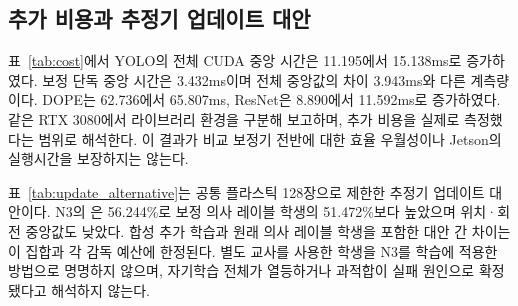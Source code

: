 \subsection{추가 비용과 추정기 업데이트 대안}
표~\ref{tab:cost}에서 YOLO의 전체 CUDA 중앙 시간은 11.195에서 15.138ms로 증가하였다. 보정 단독 중앙 시간은 3.432ms이며 전체 중앙값의 차이 3.943ms와 다른 계측량이다. DOPE는 62.736에서 65.807ms, ResNet은 8.890에서 11.592ms로 증가하였다. 같은 RTX 3080에서 라이브러리 환경을 구분해 보고하며, 추가 비용을 실제로 측정했다는 범위로 해석한다. 이 결과가 비교 보정기 전반에 대한 효율 우월성이나 Jetson의 실행시간을 보장하지는 않는다.


표~\ref{tab:update_alternative}는 공통 플라스틱 128장으로 제한한 추정기 업데이트 대안이다. N3의 \pckten 은 56.244\%로 보정 의사 레이블 학생의 51.472\%보다 높았으며 위치·회전 중앙값도 낮았다. 합성 추가 학습과 원래 의사 레이블 학생을 포함한 대안 간 차이는 이 집합과 각 감독 예산에 한정된다. 별도 교사를 사용한 학생을 N3를 학습에 적용한 방법으로 명명하지 않으며, 자기학습 전체가 열등하거나 과적합이 실패 원인으로 확정됐다고 해석하지 않는다.

